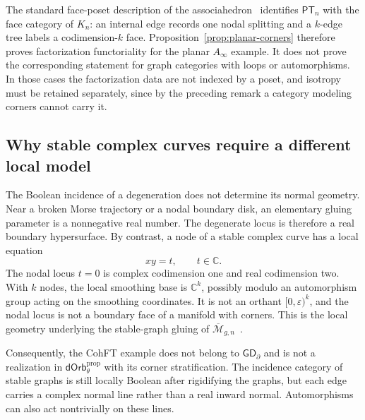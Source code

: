 \documentclass[11pt,letterpaper,twoside]{article}
\theoremstyle{plain}
\theoremstyle{definition}
\theoremstyle{remark}
\let\cite\citep
\newcommand{\Ainf}{A_\infty}
\newcommand{\BGrm}{\mathsf{GD}_{\partial}}
\newcommand{\dOrb}{\mathsf{dOrb}}
\begin{document}
The standard face-poset description of the associahedron~\cite{stasheff1963,markl2002} identifies \(\mathsf{PT}_n\) with the face category of \(K_n\): an internal edge records one nodal splitting and a \(k\)-edge tree labels a codimension-\(k\) face.  Proposition~\ref{prop:planar-corners} therefore proves factorization functoriality for the planar \(\Ainf\) example.  It does not prove the corresponding statement for graph categories with loops or automorphisms.  In those cases the factorization data are not indexed by a poset, and isotropy must be retained separately, since by the preceding remark a category modeling corners cannot carry it.

\subsection{Why stable complex curves require a different local model}\label{sec:complex-local-model}

The Boolean incidence of a degeneration does not determine its normal geometry.  Near a broken Morse trajectory or a nodal boundary disk, an elementary gluing parameter is a nonnegative real number.  The degenerate locus is therefore a real boundary hypersurface.  By contrast, a node of a stable complex curve has a local equation
\begin{equation}\label{eq:node-smoothing}
 xy=t,
 \qquad t\in\mathbb C.
\end{equation}
The nodal locus \(t=0\) is complex codimension one and real codimension two.  With \(k\) nodes, the local smoothing base is \(\mathbb C^k\), possibly modulo an automorphism group acting on the smoothing coordinates.  It is not an orthant \([0,\varepsilon)^k\), and the nodal locus is not a boundary face of a manifold with corners.  This is the local geometry underlying the stable-graph gluing of \(\overline{\mathcal M}_{g,n}\)~\cite{delignemumford1969,getzlerkapranov1998}.

Consequently, the CohFT example does not belong to \(\BGrm\) and is not a realization in \(\dOrb_\theta^{\mathrm{prop}}\) with its corner stratification.  The incidence category of stable graphs is still locally Boolean after rigidifying the graphs, but each edge carries a complex normal line rather than a real inward normal.  Automorphisms can also act nontrivially on these lines.
\end{document}
